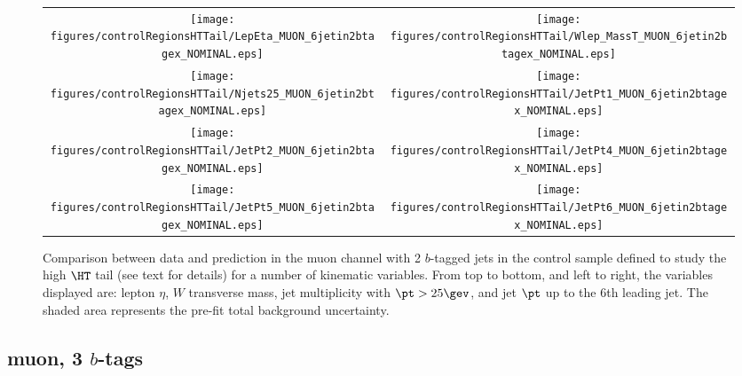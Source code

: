 \begin{figure}[htbp]
\begin{center}
\begin{tabular}{cc}
%
\texttt{[image: figures/controlRegionsHTTail/LepEta\_MUON\_6jetin2btagex\_NOMINAL.eps]} &
\texttt{[image: figures/controlRegionsHTTail/Wlep\_MassT\_MUON\_6jetin2btagex\_NOMINAL.eps]} \\
\texttt{[image: figures/controlRegionsHTTail/Njets25\_MUON\_6jetin2btagex\_NOMINAL.eps]} &
\texttt{[image: figures/controlRegionsHTTail/JetPt1\_MUON\_6jetin2btagex\_NOMINAL.eps]} \\
\texttt{[image: figures/controlRegionsHTTail/JetPt2\_MUON\_6jetin2btagex\_NOMINAL.eps]} &
\texttt{[image: figures/controlRegionsHTTail/JetPt4\_MUON\_6jetin2btagex\_NOMINAL.eps]} \\
\texttt{[image: figures/controlRegionsHTTail/JetPt5\_MUON\_6jetin2btagex\_NOMINAL.eps]} &
\texttt{[image: figures/controlRegionsHTTail/JetPt6\_MUON\_6jetin2btagex\_NOMINAL.eps]} \\
\end{tabular}\caption{\small {Comparison between data and prediction in the muon channel with 2 $b$-tagged jets in the control sample
defined to study the high $\HT$ tail (see text for details)  for a number of kinematic
variables. From top to bottom, and left to right, the variables displayed are: lepton $\eta$, $W$ transverse mass, jet multiplicity with $\pt>25\gev$, 
and jet $\pt$ up to the 6th leading jet.
The shaded area represents the pre-fit total background uncertainty.}}
\label{fig:MUON_controlHTTail_2btagex_2}
\end{center}
\end{figure}

\clearpage
\subsection{muon, 3 $b$-tags}
\label{sec:MUON_controlHTTail_3tagex}

